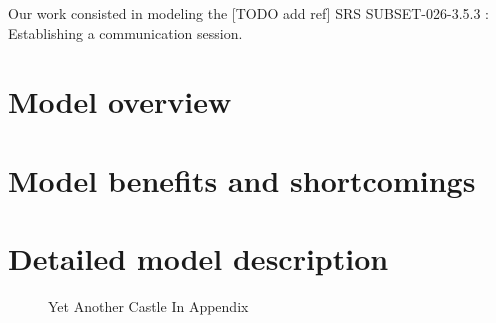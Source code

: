 \documentclass{template/openetcs_report}
\begin{document}
Our work consisted in modeling the [TODO add ref] SRS SUBSET-026-3.5.3 : Establishing a communication session.

\chapter{Model overview}
\chapter{Model benefits and shortcomings}
\chapter{Detailed model description}

\begin{figure}
  \centering
  \caption{Yet Another Castle In Appendix}
  \label{fig:castle2}
\end{figure}

\end{document}
